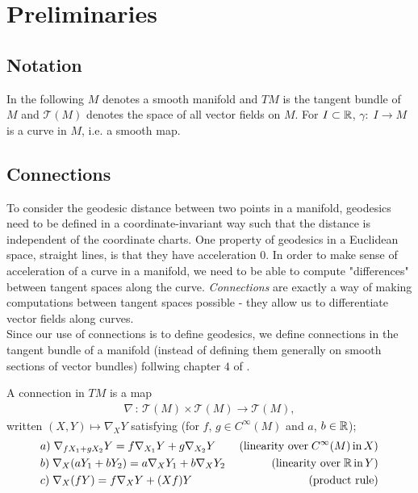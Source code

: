 \chapter{Preliminaries}

\section{Notation}

In the following $M$ denotes a smooth manifold and $TM$ is the tangent bundle of $M$ and $\mathcal{T}(M)$ denotes the space of all vector fields on $M$. For $I \subset \mathbb{R}$, $\gamma: \; I \rightarrow M$ is a curve in $M$, i.e. a smooth map.  

\section{Connections}

To consider the geodesic distance between two points in a manifold, geodesics need to be defined in a coordinate-invariant way such that the distance is independent of the coordinate charts. One property of geodesics in a Euclidean space, straight lines, is that they have acceleration $0$. In order to make sense of acceleration of a curve in a manifold, we need to be able to compute "differences" between tangent spaces along the curve. \textit{Connections} are exactly a way of making computations between tangent spaces possible - they allow us to differentiate vector fields along curves.\\[0.2 cm]
Since our use of connections is to define geodesics, we define connections in the tangent bundle of a manifold (instead of defining them generally on smooth sections of vector bundles) follwing chapter $4$ of \citet{RiemannLee}. 

\begin{definition}
A connection in $TM$ is a map
\begin{align*}
\nabla \, : \, \mathcal{T}(M) \times \mathcal{T}(M) \rightarrow \mathcal{T}(M),
\end{align*}
written $(X, Y) \mapsto \nabla_X Y$ satisfying (for $f$, $g \in C^\infty(M)$ and $a$, $b \in \mathbb{R}$);
\begin{align*}
& a) \; \nabla_{fX_1 + gX_2} Y = f\nabla_{X_1} Y + g\nabla_{X_2} Y \; \; \; \; & \text{(linearity over} \; C^\infty(M) \, \text{in} \, X) \\
& b) \; \nabla_X (aY_1 + bY_2) = a\nabla_X Y_1 + b\nabla_X Y_2 & \text{(linearity over} \; \mathbb{R} \, \text{in} \, Y) \\
& c) \; \nabla_X (fY) = f\nabla_X Y + (Xf)Y & \text{(product rule)}
\end{align*}
\end{definition}

